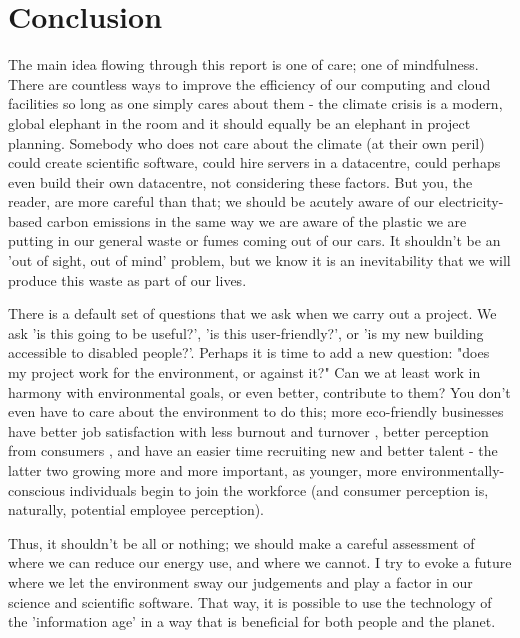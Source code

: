 \documentclass{article}
\begin{document}
\section{Conclusion}
The main idea flowing through this report is one of care; one of mindfulness. There are countless ways to improve the efficiency of our computing and cloud facilities so long as one simply cares about them - the climate crisis is a modern, global elephant in the room and it should equally be an elephant in project planning. Somebody who does not care about the climate (at their own peril) could create scientific software, could hire servers in a datacentre, could perhaps even build their own datacentre, not considering these factors. But you, the reader, are more careful than that; we should be acutely aware of our electricity-based carbon emissions in the same way we are aware of the plastic we are putting in our general waste or fumes coming out of our cars. It shouldn't be an 'out of sight, out of mind' problem, but we know it is an inevitability that we will produce this waste as part of our lives.\newline

There is a default set of questions that we ask when we carry out a project. We ask 'is this going to be useful?', 'is this user-friendly?', or 'is my new building accessible to disabled people?'. Perhaps it is time to add a new question: "does my project work for the environment, or against it?" Can we at least work in harmony with environmental goals, or even better, contribute to them? You don't even have to care about the environment to do this; more eco-friendly businesses have better job satisfaction with less burnout and turnover \citep{yu2020hotels} \citep{reverte2016influence}, better perception from consumers \citep{miles1993eco}, and have an easier time recruiting new and better talent \citep{aranganathan2018green} - the latter two growing more and more important, as younger, more environmentally-conscious individuals begin to join the workforce (and consumer perception is, naturally, potential employee perception).\newline

Thus, it shouldn't be all or nothing; we should make a careful assessment of where we can reduce our energy use, and where we cannot. I try to evoke a future where we let the environment sway our judgements and play a factor in our science and scientific software. That way, it is possible to use the technology of the 'information age' in a way that is beneficial for both people and the planet.



\end{document}
